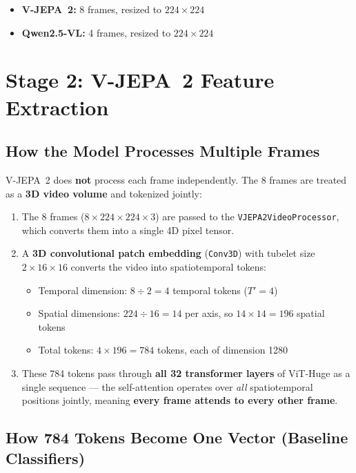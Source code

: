 \documentclass[a4paper, 12pt]{article}
\begin{document}
\begin{itemize}
    \item \textbf{V-JEPA~2:} 8 frames, resized to $224 \times 224$
    \item \textbf{Qwen2.5-VL:} 4 frames, resized to $224 \times 224$
\end{itemize}

\section{Stage 2: V-JEPA~2 Feature Extraction}

\subsection{How the Model Processes Multiple Frames}

V-JEPA~2 does \textbf{not} process each frame independently. The 8 frames are treated as a \textbf{3D video volume} and tokenized jointly:

\begin{enumerate}
    \item The 8 frames ($8 \times 224 \times 224 \times 3$) are passed to the \texttt{VJEPA2VideoProcessor}, which converts them into a single 4D pixel tensor.
    \item A \textbf{3D convolutional patch embedding} (\texttt{Conv3D}) with tubelet size $2 \times 16 \times 16$ converts the video into spatiotemporal tokens:
    \begin{itemize}
        \item Temporal dimension: $8 \div 2 = 4$ temporal tokens ($T'=4$)
        \item Spatial dimensions: $224 \div 16 = 14$ per axis, so $14 \times 14 = 196$ spatial tokens
        \item Total tokens: $4 \times 196 = 784$ tokens, each of dimension 1280
    \end{itemize}
    \item These 784 tokens pass through \textbf{all 32 transformer layers} of ViT-Huge as a single sequence --- the self-attention operates over \emph{all} spatiotemporal positions jointly, meaning \textbf{every frame attends to every other frame}.
\end{enumerate}

\subsection{How 784 Tokens Become One Vector (Baseline Classifiers)}
\end{document}

